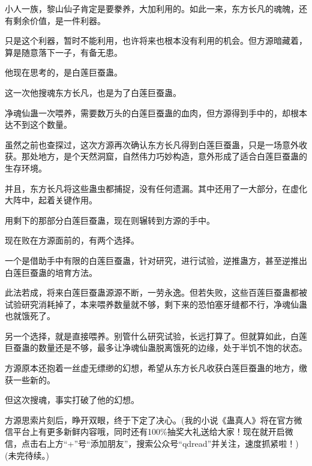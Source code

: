 \begin{this_body}
小人一族，黎山仙子肯定是要豢养，大加利用的。如此一来，东方长凡的魂魄，还有剩余价值，是一件利器。

只是这个利器，暂时不能利用，也许将来也根本没有利用的机会。但方源暗藏着，算是随意落下一子，有备无患。

他现在思考的，是白莲巨蚕蛊。

这一次他搜魂东方长凡，也是为了白莲巨蚕蛊。

净魂仙蛊一次喂养，需要数万头的白莲巨蚕蛊的血肉，但方源得到手中的，却根本达不到这个数量。

虽然之前也查探过，这次方源再次确认东方长凡得到白莲巨蚕蛊，只是一场意外收获。那处地方，是个天然洞窟，自然伟力巧妙构造，意外形成了适合白莲巨蚕蛊的生存环境。

并且，东方长凡将这些蛊虫都捕捉，没有任何遗漏。其中还用了一大部分，在虚化大阵中，起着关键作用。

用剩下的那部分白莲巨蚕蛊，现在则辗转到方源的手中。

现在败在方源面前的，有两个选择。

一个是借助手中有限的白莲巨蚕蛊，针对研究，进行试验，逆推蛊方，甚至逆推出白莲巨蚕蛊的培育方法。

此法若成，将来白莲巨蚕蛊源源不断，一劳永逸。但若失败，这些百莲巨蚕蛊都被试验研究消耗掉了，本来喂养数量就不够，剩下来的恐怕塞牙缝都不行，净魂仙蛊也就饿死了。

另一个选择，就是直接喂养。别管什么研究试验，长远打算了。但就算如此，白莲巨蚕蛊的数量还是不够，最多让净魂仙蛊脱离饿死的边缘，处于半饥不饱的状态。

方源原本还抱着一丝虚无缥缈的幻想，希望从东方长凡收获白莲巨蚕蛊的地方，缴获一些新的。

但这次搜魂，事实打破了他的幻想。

方源思索片刻后，睁开双眼，终于下定了决心。(我的小说《蛊真人》将在官方微信平台上有更多新鲜内容哦，同时还有100\%抽奖大礼送给大家！现在就开启微信，点击右上方“+”号“添加朋友”，搜索公众号“qdread”并关注，速度抓紧啦！)(未完待续。)

\end{this_body}

